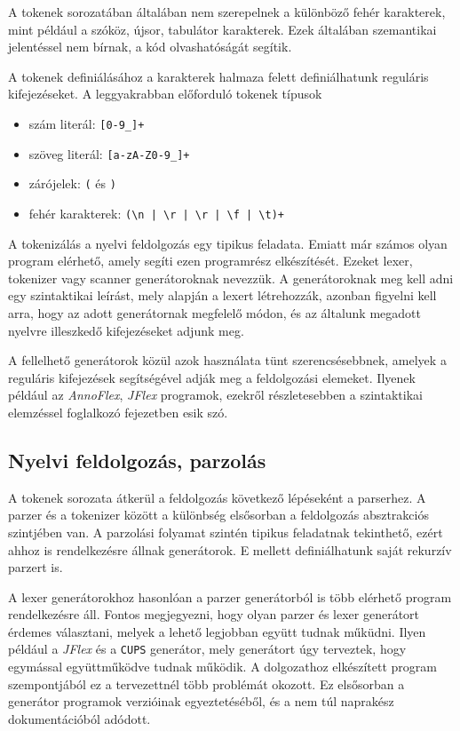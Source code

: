 A tokenek sorozatában általában nem szerepelnek a különböző fehér karakterek, mint például a szóköz, újsor, tabulátor karakterek.
Ezek általában szemantikai jelentéssel nem bírnak, a kód olvashatóságát segítik.

A tokenek definiálásához a karakterek halmaza felett definiálhatunk reguláris kifejezéseket.
A leggyakrabban előforduló tokenek típusok
\begin{itemize}
\item szám literál: \texttt{[0-9\_]+}
\item szöveg literál: \texttt{[a-zA-Z0-9\_]+}
\item zárójelek: \texttt{(} és \texttt{)}
\item fehér karakterek: \verb$(\n | \r | \r | \f | \t)+$
\end{itemize}

A tokenizálás a nyelvi feldolgozás egy tipikus feladata.
Emiatt már számos olyan program elérhető, amely segíti ezen programrész elkészítését.
Ezeket lexer, tokenizer vagy scanner generátoroknak nevezzük.
A generátoroknak meg kell adni egy szintaktikai leírást, mely alapján a lexert létrehozzák, azonban figyelni kell arra, hogy az adott generátornak megfelelő módon, és az általunk megadott nyelvre illeszkedő kifejezéseket adjunk meg.

A fellelhető generátorok közül azok használata tünt szerencsésebbnek, amelyek a reguláris kifejezések segítségével adják meg a feldolgozási elemeket. Ilyenek például az \textit{AnnoFlex}, \textit{JFlex} programok, ezekről részletesebben a szintaktikai elemzéssel foglalkozó fejezetben esik szó.

\subsection{Nyelvi feldolgozás, parzolás}

A tokenek sorozata átkerül a feldolgozás következő lépéseként a parserhez.
A parzer és a tokenizer között a különbség elsősorban a feldolgozás absztrakciós szintjében van.
A parzolási folyamat szintén tipikus feladatnak tekinthető, ezért ahhoz is rendelkezésre állnak generátorok.
E mellett definiálhatunk saját rekurzív parzert is.

A lexer generátorokhoz hasonlóan a parzer generátorból is több elérhető program rendelkezésre áll.
Fontos megjegyezni, hogy olyan parzer és lexer generátort érdemes választani, melyek a lehető legjobban együtt tudnak műküdni.
Ilyen például a \textit{JFlex} és a \texttt{CUPS} generátor, mely generátort úgy terveztek, hogy egymással együttműködve tudnak működik.
A dolgozathoz elkészített program szempontjából ez a tervezettnél több problémát okozott.
Ez elsősorban a generátor programok verzióinak egyeztetéséből, és a nem túl naprakész dokumentációból adódott.

